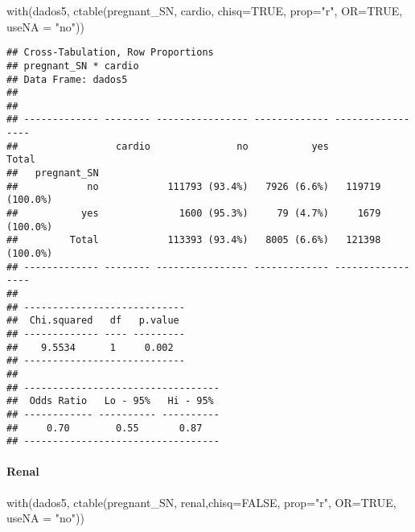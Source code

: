 \documentclass[
]{article}
\newenvironment{Shaded}{\begin{snugshade}}{\end{snugshade}}
\newcommand{\AttributeTok}[1]{\textcolor[rgb]{0.77,0.63,0.00}{#1}}
\newcommand{\ConstantTok}[1]{\textcolor[rgb]{0.00,0.00,0.00}{#1}}
\newcommand{\FunctionTok}[1]{\textcolor[rgb]{0.00,0.00,0.00}{#1}}
\newcommand{\NormalTok}[1]{#1}
\newcommand{\StringTok}[1]{\textcolor[rgb]{0.31,0.60,0.02}{#1}}
\begin{document}
\begin{Shaded}
\begin{Highlighting}[]
\FunctionTok{with}\NormalTok{(dados5, }\FunctionTok{ctable}\NormalTok{(pregnant\_SN, cardio, }\AttributeTok{chisq=}\ConstantTok{TRUE}\NormalTok{, }\AttributeTok{prop=}\StringTok{"r"}\NormalTok{, }\AttributeTok{OR=}\ConstantTok{TRUE}\NormalTok{, }\AttributeTok{useNA =} \StringTok{"no"}\NormalTok{))}
\end{Highlighting}
\end{Shaded}

\begin{verbatim}
## Cross-Tabulation, Row Proportions  
## pregnant_SN * cardio  
## Data Frame: dados5  
## 
## 
## ------------- -------- ---------------- ------------- -----------------
##                 cardio               no           yes             Total
##   pregnant_SN                                                          
##            no            111793 (93.4%)   7926 (6.6%)   119719 (100.0%)
##           yes              1600 (95.3%)     79 (4.7%)     1679 (100.0%)
##         Total            113393 (93.4%)   8005 (6.6%)   121398 (100.0%)
## ------------- -------- ---------------- ------------- -----------------
## 
## ----------------------------
##  Chi.squared   df   p.value 
## ------------- ---- ---------
##    9.5534      1     0.002  
## ----------------------------
## 
## ----------------------------------
##  Odds Ratio   Lo - 95%   Hi - 95% 
## ------------ ---------- ----------
##     0.70        0.55       0.87   
## ----------------------------------
\end{verbatim}

\hypertarget{renal}{%
\paragraph{\texorpdfstring{{ Renal }}{ Renal }}\label{renal}}

\begin{Shaded}
\begin{Highlighting}[]
\FunctionTok{with}\NormalTok{(dados5, }\FunctionTok{ctable}\NormalTok{(pregnant\_SN, renal,}\AttributeTok{chisq=}\ConstantTok{FALSE}\NormalTok{, }\AttributeTok{prop=}\StringTok{"r"}\NormalTok{, }\AttributeTok{OR=}\ConstantTok{TRUE}\NormalTok{, }\AttributeTok{useNA =} \StringTok{"no"}\NormalTok{))}
\end{Highlighting}
\end{Shaded}
\end{document}

